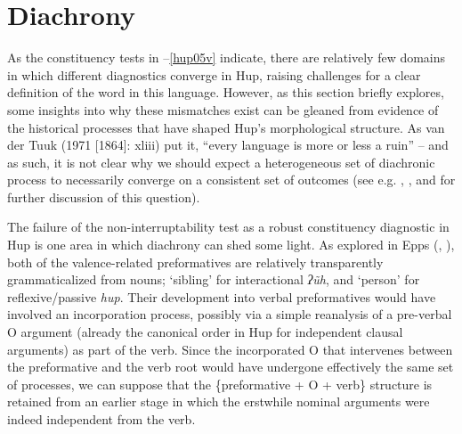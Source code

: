 \documentclass[output=paper]{langscibook}
\begin{document}
\section{Diachrony} \label{sec:hup:key:6}

As the constituency tests in --\ref{hup05v} indicate, there are relatively few domains in which different diagnostics converge in Hup, raising challenges for a clear definition of the word in this language. However, as this section briefly explores, some insights into why these mismatches exist can be gleaned from evidence of the historical processes that have shaped Hup's morphological structure. As van der Tuuk (1971 [1864]: xliii) put it, “every language is more or less a ruin” – and as such, it is not clear why we should expect a heterogeneous set of diachronic process to necessarily converge on a consistent set of outcomes (see e.g. \citealt[287-288]{Nichols2008}, \citealt{Cristofaro2019}, and \citealt{Schmidtke-Bode2019} for further discussion of this question).

The failure of the non-interruptability test as a robust constituency diagnostic in Hup is one area in which diachrony can shed some light. As explored in Epps (\citeyear{Epps2008}, \citeyear{Epps2010}), both of the valence-related preformatives are relatively transparently grammaticalized from nouns; `sibling' for interactional \textit{ʔ\~uh}, and `person' for reflexive/passive \textit{hup}. Their development into verbal preformatives would have involved an incorporation process, possibly via a simple reanalysis of a pre-verbal O argument (already the canonical order in Hup for independent clausal arguments) as part of the verb. Since the incorporated O that intervenes between the preformative and the verb root would have undergone effectively the same set of processes, we can suppose that the \{preformative + O + verb\} structure is retained from an earlier stage in which the erstwhile nominal arguments were indeed independent from the verb.
\end{document}
